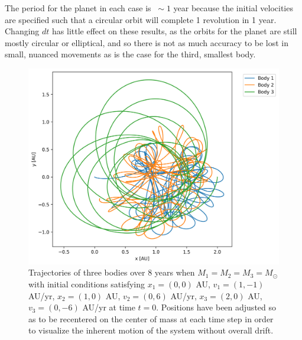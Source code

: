 \documentclass{article}
\begin{document}
The period for the planet in each case is $\ \sim 1$ year because the initial velocities are specified such that a circular orbit will complete 1 revolution in 1 year. Changing $dt$ has little effect on these results, as the orbits for the planet are still mostly circular or elliptical, and so there is not as much accuracy to be lost in small, nuanced movements as is the case for the third, smallest body.

\bigskip
{}
\medskip

\begin{figure}[H]
    \centering
    \includegraphics[width=5.5in]{homework4/p2_CM_scaled.png}
    \caption{Trajectories of three bodies over 8 years when $M_1=M_2=M_3=M_\odot$ with initial conditions satisfying $x_1 = (0,0)$ AU, $v_1 = (1,−1)$ AU/yr, $x_2 = (1,0)$ AU, $v_2 = (0,6)$ AU/yr, $x_3 = (2,0)$ AU, $v_3 = (0,−6)$ AU/yr at time $t=0$. Positions have been adjusted so as to be recentered on the center of mass at each time step in order to visualize the inherent motion of the system without overall drift.}
    \label{fig:p2_orbits}
\end{figure}
\end{document}
